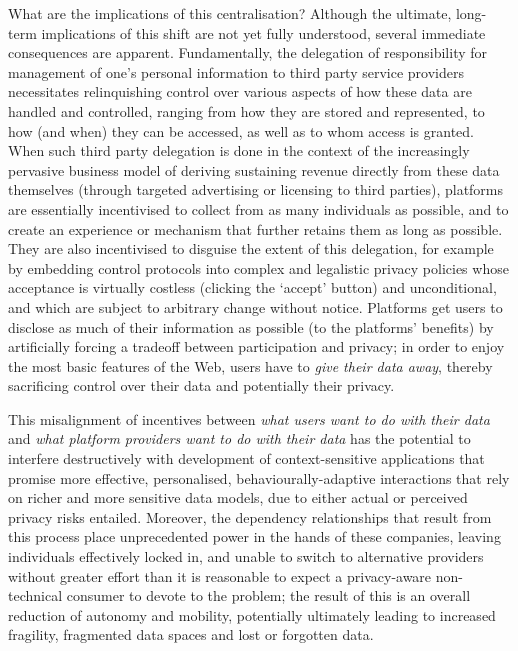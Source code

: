 \documentclass[runningheads,a4paper]{llncs}
\begin{document}
What are the implications of this centralisation?  Although the ultimate, long-term implications of this shift are not yet fully understood, several immediate consequences are apparent. Fundamentally, the delegation of responsibility for management of one's personal information to third party service providers necessitates relinquishing control over various aspects of how these data are handled and controlled, ranging from how they are stored and represented, to how (and when) they can be accessed, as well as to whom access is granted.  When such third party delegation is done in the context of the increasingly pervasive business model of deriving sustaining revenue directly from these data themselves (through targeted advertising or licensing to third parties), platforms are essentially incentivised to collect from as many individuals as possible, and to create an experience or mechanism that further retains them as long as possible. They are also incentivised to disguise the extent of this delegation, for example by embedding control protocols into complex and legalistic privacy policies whose acceptance is virtually costless (clicking the `accept' button) and unconditional, and which are subject to arbitrary change without notice. Platforms get users to disclose as much of their information as possible (to the platforms' benefits) by artificially forcing a tradeoff between participation and privacy; in order to enjoy the most basic features of the Web, users have to \emph{give their data away}, thereby sacrificing control over their data and potentially their privacy.

This misalignment of incentives between \emph{what users want to do with their data} and \emph{what platform providers want to do with their data} has the potential to interfere destructively with development of context-sensitive applications that promise more effective, personalised, behaviourally-adaptive interactions that rely on richer and more sensitive data models, due to either actual or perceived privacy risks entailed.  Moreover, the dependency relationships that result from this process place unprecedented power in the hands of these companies, leaving individuals effectively locked in, and unable to switch to alternative providers without greater effort than it is reasonable to expect a privacy-aware non-technical consumer to devote to the problem; the result of this is an overall reduction of autonomy and mobility, potentially ultimately leading to increased fragility, fragmented data spaces and lost or forgotten data\cite{lostlegacy}.
\end{document}
